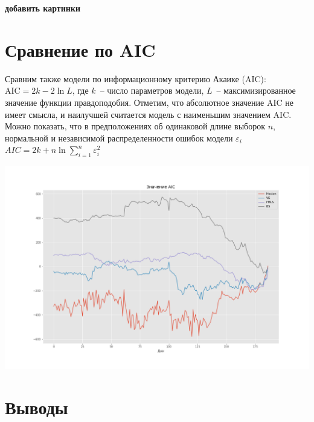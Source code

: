 \documentclass[oneside, final, 12pt]{article}
\begin{document}
\textbf{добавить картинки}


\newpage
\section{Сравнение по AIC}
Сравним также модели по информационному критерию Акаике (AIC)\cite{AIC:paper}: \( \text{AIC} = 2k - 2\ln{L} \), где $k$~-- число параметров модели,  $L$~-- максимизированное значение функции правдоподобия. Отметим, что абсолютное значение AIC не имеет смысла, и наилучшей считается модель с наименьшим значением AIC. Можно показать, что в предположениях об одинаковой длине выборок $n$, нормальной и независимой распределенности ошибок модели $\varepsilon_i$ \( AIC = 2k +  n\ln{\sum\limits_{i = 1}^n}{\varepsilon_i^2}\)
\begin{center}
  \includegraphics[width=1\linewidth]{img/AIC_187.png}
\end{center}


\newpage
\section{Выводы}


\newpage
\end{document}
